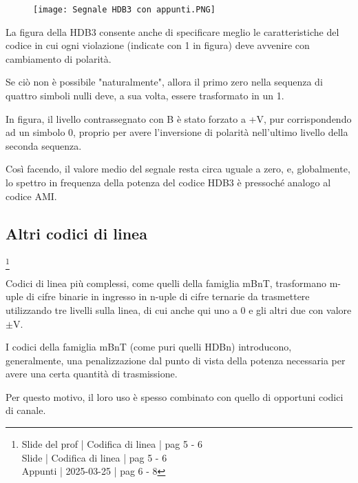 \begin{figure}[h]
    \centering
    \texttt{[image: Segnale HDB3 con appunti.PNG]}
\end{figure} 

La figura della HDB3 consente anche di specificare meglio le caratteristiche del codice 
in cui ogni violazione (indicate con 1 in figura) deve avvenire con cambiamento di polarità. \newline 

Se ciò non è possibile "naturalmente", allora il primo zero nella sequenza di quattro simboli nulli deve, 
a sua volta, essere trasformato in un 1. \newline 

In figura, il livello contrassegnato con B è stato forzato a +V, pur corrispondendo ad un simbolo 0, 
proprio per avere l'inversione di polarità nell'ultimo livello della seconda sequenza. \newline 

Così facendo, il valore medio del segnale resta circa uguale a zero, e, globalmente, lo spettro in frequenza della potenza del codice HDB3 è pressoché analogo al codice AMI. \newline 

\newpage 

\subsection{Altri codici di linea}
\footnote{Slide del prof | Codifica di linea | pag 5 - 6\\  
Slide | Codifica di linea | pag  5 - 6\\
Appunti | 2025-03-25 | pag 6 - 8
}

Codici di linea più complessi, come quelli della famiglia mBnT, 
trasformano m-uple di cifre binarie in ingresso in n-uple di cifre ternarie da trasmettere utilizzando tre livelli sulla linea, 
di cui anche qui uno a 0 e gli altri due con valore $\pm$V. \newline 

I codici della famiglia mBnT (come puri quelli HDBn) introducono, generalmente, 
una penalizzazione dal punto di vista della potenza necessaria per avere una certa quantità di trasmissione. \newline 

Per questo motivo, il loro uso è spesso combinato con quello di opportuni codici di canale. \newline 

